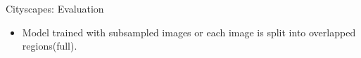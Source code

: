 \documentclass{beamer}
\begin{document}
\begin{frame}{Cityscapes: Evaluation}	
\begin{itemize}
\item Model trained with subsampled images or each image is split into overlapped regions({\color{blue}full}).
\end{itemize}
\vspace{-0.2cm}
\begin{table}
	\setlength{\tabcolsep}{3pt}
   	\captionsetup{justification=centering}
	\caption{DeepLab results on Cityscapes validation set.\\{\color{blue}Full}: Model trained with full resolution images($2048\times1024$). {\color{blue}Aug}:\\ Randomly Scaled Input, {\color{blue}LargeFOV}: single branch, {\color{blue}ASPP}:\\ four branches, $r = \{6, 12, 18, 24\}$.}
\end{table}
\end{frame}
\end{document}
